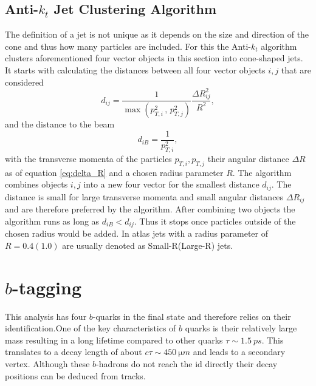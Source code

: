 \subsection{Anti-$k_t$ Jet Clustering Algorithm}\label{sec:anti_kt}
The definition of a jet is not unique as it depends on the size and direction of the cone and thus how many particles are included. For this the Anti-$k_t$ algorithm \citep{cacciari2008anti} clusters aforementioned four vector objects in this section into cone-shaped jets. It starts with calculating the distances between all four vector objects $i,j$ that are considered
\begin{equation}
  d_{ij}=\frac{1}{\max(p_{T,i}^{2}\,,\,p_{T,j}^{2})} \frac{\Delta R_{ij}^2}{R^2},
\end{equation}
and the distance to the beam
\begin{equation}
  d_{iB}=\frac{1}{p_{T,i}^{2}},
\end{equation}
with the transverse momenta of the particles $p_{T,i},p_{T,j}$ their angular distance $\Delta R$ as of equation \ref{eq:delta_R} and a chosen radius parameter $R$. The algorithm combines objects $i,j$ into a new four vector for the smallest distance $d_{ij}$. The distance is small for large transverse momenta \pt and small angular distances $\Delta R_{ij}$ and are therefore preferred by the algorithm. After combining two objects the algorithm runs as long as $d_{iB}<d_{ij}$. Thus it stops once particles outside of the chosen radius would be added. In \ac{atlas} jets with a radius parameter of $R=0.4 (1.0)$ are usually denoted as Small-R(Large-R) jets.



\section{$b$-tagging}\label{sec:b_tagging}
This analysis has four $b$-quarks in the final state and therefore relies on their identification.One of the key characteristics of $b$ quarks is their relatively large mass resulting in a long lifetime compared to other quarks $\tau\sim\qty{1.5}{ps}$. This translates to a decay length of about $c\tau \sim \qty{450}{\micro m}$ and leads to a secondary vertex. Although these $b$-hadrons do not reach the \ac{id} directly their decay positions can be deduced from tracks.

